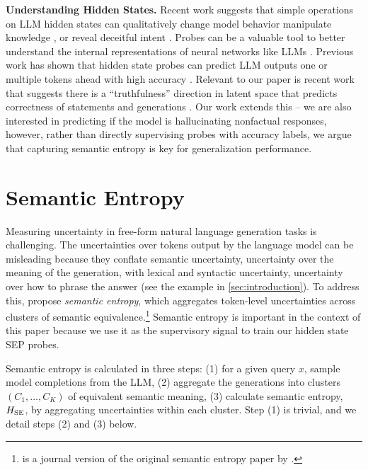 \documentclass{article}
\begin{document}
\textbf{Understanding Hidden States.}
Recent work suggests that simple operations on LLM hidden states can qualitatively change model behavior \citep{zou2023representation,subramani2022extracting,rimsky2023steering} manipulate knowledge \citep{hernandez2023measuring}, or reveal deceitful intent \citep{macdiarmid2024sleeperagentprobes}.
Probes can be a valuable tool to better understand the internal representations of neural networks like LLMs \cite{alain2016understanding, belinkov2021probing}.
Previous work has shown that hidden state probes can predict LLM outputs one or multiple tokens ahead with high accuracy \citep{belrose2023eliciting,pal2023futurelens}.
Relevant to our paper is recent work that suggests there is a ``truthfulness'' direction in latent space that predicts correctness of statements and generations \citep{marks2023geometry,azaria2023internal,burns2024discovering,li2024inference,azaria2023internal}.
Our work extends this -- we are also interested in predicting if the model is hallucinating nonfactual responses, however, rather than directly supervising probes with accuracy labels, we argue that capturing semantic entropy is key for generalization performance.

\section{Semantic Entropy} 
\vspace{-1.5mm}
\label{sec:semantic entropy}
Measuring uncertainty in free-form natural language generation tasks is challenging.
The uncertainties over tokens output by the language model can be misleading because they conflate semantic uncertainty, uncertainty over the meaning of the generation, with lexical and syntactic uncertainty, uncertainty over how to phrase the answer (see the example in \cref{sec:introduction}).
To address this, \citet{farquhar2024detecting} propose \emph{semantic entropy}, which aggregates token-level uncertainties across clusters of semantic equivalence.\footnote{%
\citet{farquhar2024detecting} is a journal version of the original semantic entropy paper by \citet{kuhn2023semantic}.
}
Semantic entropy is important in the context of this paper because we use it as the supervisory signal to train our hidden state SEP probes.

Semantic entropy is calculated in three steps: 
(1) for a given query $x$, sample model completions from the LLM,
(2) aggregate the generations into clusters $(C_1, \dots, C_K)$ of equivalent semantic meaning, 
(3) calculate semantic entropy, $H_{\textup{SE}}$, by aggregating uncertainties within each cluster. 
Step (1) is trivial, and we detail steps (2) and (3) below.
\end{document}
